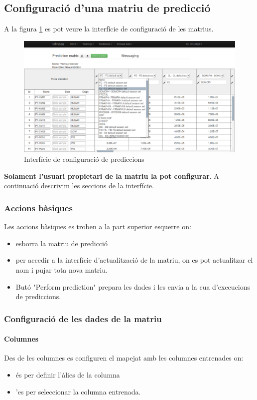 \subsection{Configuració d'una matriu de predicció}
A la figura \ref{fig:view_training_pending} es pot veure la interfície de configuració de les matrius.
\begin{figure}[h!]
  \centering
  \includegraphics[scale=0.35]{img/userguide/matrix_prediction_configuration_gui.png}
  \caption{Interfície de configuració de prediccions}
  \label{fig:view_training_pending}
\end{figure}
\textbf{Solament l'usuari propietari de la matriu la pot configurar}. A continuació descrivim les seccions de la interfície.

\subsubsection{Accions bàsiques}
Les accions bàsiques es troben a la part superior esquerre on:
\begin{itemize}
\item \iconremove esborra la matriu de predicció
\item \iconupdate per accedir a la interfície d'actualització de la matriu, on es pot actualitzar el nom i pujar tota nova matriu.
\item But\'{o} "Perform prediction" prepara les dades i les envia a la cua d'execucions de prediccions.
\end{itemize}

\subsubsection{Configuració de les dades de la matriu}
\paragraph{Columnes} Des de les columnes es configuren el mapejat amb les columnes entrenades on:
\begin{itemize}
\item \iconalias \'{e}s per definir l'\`{a}lies de la columna
\item \iconvariable '{e}s per seleccionar la columna entrenada.
\end{itemize}

